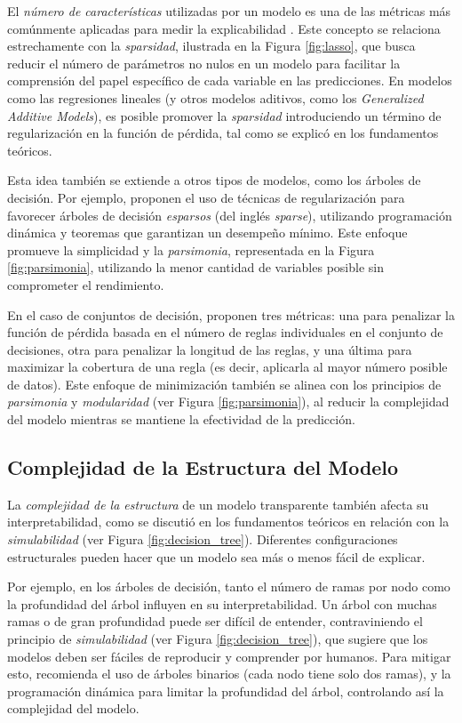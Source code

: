 El \textit{número de características} utilizadas por un modelo es una de las métricas más comúnmente aplicadas para medir la explicabilidad \cite{Lin-2020, lakkaraju-2016, Poursabzi-2021}. Este concepto se relaciona estrechamente con la \textit{sparsidad}, ilustrada en la Figura \ref{fig:lasso}, que busca reducir el número de parámetros no nulos en un modelo para facilitar la comprensión del papel específico de cada variable en las predicciones. En modelos como las regresiones lineales (y otros modelos aditivos, como los \textit{Generalized Additive Models}), es posible promover la \textit{sparsidad} introduciendo un término de regularización en la función de pérdida, tal como se explicó en los fundamentos teóricos.

Esta idea también se extiende a otros tipos de modelos, como los árboles de decisión. Por ejemplo, \cite{Hu-2019, Lin-2020} proponen el uso de técnicas de regularización para favorecer árboles de decisión \textit{esparsos} (del inglés \textit{sparse}), utilizando programación dinámica y teoremas que garantizan un desempeño mínimo. Este enfoque promueve la simplicidad y la \textit{parsimonia}, representada en la Figura \ref{fig:parsimonia}, utilizando la menor cantidad de variables posible sin comprometer el rendimiento.

En el caso de conjuntos de decisión, \cite{lakkaraju-2016} proponen tres métricas: una para penalizar la función de pérdida basada en el número de reglas individuales en el conjunto de decisiones, otra para penalizar la longitud de las reglas, y una última para maximizar la cobertura de una regla (es decir, aplicarla al mayor número posible de datos). Este enfoque de minimización también se alinea con los principios de \textit{parsimonia} y \textit{modularidad} (ver Figura \ref{fig:parsimonia}), al reducir la complejidad del modelo mientras se mantiene la efectividad de la predicción.

\subsection{Complejidad de la Estructura del Modelo}

La \textit{complejidad de la estructura} de un modelo transparente también afecta su interpretabilidad, como se discutió en los fundamentos teóricos en relación con la \textit{simulabilidad} (ver Figura \ref{fig:decision_tree}). Diferentes configuraciones estructurales pueden hacer que un modelo sea más o menos fácil de explicar.

Por ejemplo, en los árboles de decisión, tanto el número de ramas por nodo como la profundidad del árbol influyen en su interpretabilidad. Un árbol con muchas ramas o de gran profundidad puede ser difícil de entender, contraviniendo el principio de \textit{simulabilidad} (ver Figura \ref{fig:decision_tree}), que sugiere que los modelos deben ser fáciles de reproducir y comprender por humanos. Para mitigar esto, \cite{Lin-2020} recomienda el uso de árboles binarios (cada nodo tiene solo dos ramas), y la programación dinámica para limitar la profundidad del árbol, controlando así la complejidad del modelo.

